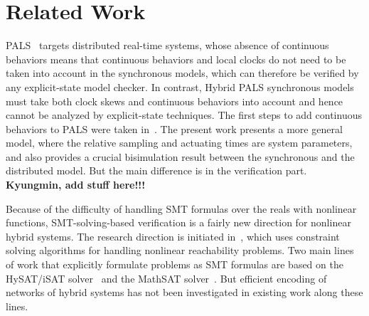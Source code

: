 

\section{Related Work}
\label{sec:related-work}




PALS~\cite{pals-rtss09,mr-pals-journal,pals-tcs,al2012pattern} targets
distributed real-time systems, whose absence of continuous behaviors
means that continuous behaviors and local clocks do not need to be
taken into account in the synchronous models, which can therefore be
verified by any explicit-state model checker. In contrast, Hybrid PALS
synchronous models must take both clock skews and continuous behaviors
into account and hence cannot be analyzed by explicit-state
techniques. The first steps to add continuous behaviors to PALS were
taken in~\cite{hybrid-pals}. The present work presents a more general
model, where the relative sampling and actuating times are system
parameters,  and also provides a crucial bisimulation result between
the 
synchronous and the distributed model. But the main difference is in the
verification part. \textbf{Kyungmin, add stuff here!!!}


Because of the difficulty of handling SMT
formulas over the reals with nonlinear functions, 
SMT-solving-based verification is a fairly new direction for nonlinear hybrid
systems. The research
direction is initiated in~\cite{ratschan2007safety}, which uses constraint
solving algorithms for handling nonlinear reachability problems. Two
main lines of work that explicitly formulate problems as SMT formulas
are based on the HySAT/iSAT
solver~\cite{DBLP:journals/fmsd/FranzleH07,eggers2008sat}
and the MathSAT
solver~\cite{DBLP:conf/aaai/CimattiMT12,DBLP:conf/fmcad/CimattiMT12}.
But efficient encoding of networks of hybrid systems has not been
investigated in existing work along these lines. 

